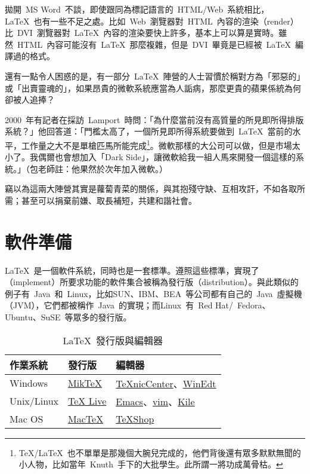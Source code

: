 拋開~MS Word~不談，即使跟同為標記語言的~HTML/Web~系統相比，\LaTeX~也有一些不足之處。比如~Web~瀏覽器對~HTML~內容的渲染（render）比~DVI~瀏覽器對~\LaTeX~內容的渲染要快上許多，基本上可以算是實時。雖然~HTML~內容可能沒有~LaTeX~那麼複雜，但是~DVI~畢竟是已經被~\LaTeX~編譯過的格式。

還有一點令人困惑的是，有一部分~\LaTeX~陣營的人士習慣於稱對方為「邪惡的」或「出賣靈魂的」，如果昂貴的微軟系統應當為人詬病，那麼更貴的蘋果係統為何卻被人追捧？

2000~年有記者在採訪~Lamport~時問：「為什麼當前沒有高質量的所見即所得排版系統？」他回答道：「門檻太高了，一個所見即所得系統要做到~\LaTeX~當前的水平，工作量之大不是單槍匹馬所能完成\footnote{\TeX/\LaTeX~也不單單是那幾個大腕兒完成的，他們背後還有眾多默默無聞的小人物，比如當年~Knuth~手下的大批學生。此所謂一將功成萬骨枯。}。微軟那樣的大公司可以做，但是市場太小了。我偶爾也會想加入「Dark Side」，讓微軟給我一組人馬來開發一個這樣的系統。」（包老師註：他果然於次年加入微軟。）

竊以為這兩大陣營其實是蘿蔔青菜的關係，與其抱殘守缺、互相攻訐，不如各取所需；甚至可以捐棄前嫌、取長補短，共建和諧社會。

\section{軟件準備}
\label{sec:latexsoft}

\LaTeX~是一個軟件系統，同時也是一套標準。遵照這些標準，實現了（implement）所要求功能的軟件集合被稱為發行版（distribution）。與此類似的例子有~Java~和~Linux，比如SUN、IBM、BEA~等公司都有自己的~Java~虛擬機（JVM），它們都被稱作~Java~的實現；而Linux~有~Red Hat/~Fedora、Ubuntu、SuSE~等眾多的發行版。

\begin{table}[htbp]
\caption{\LaTeX~發行版與編輯器}
\label{tab:latexsoft}
\centering
\begin{tabular}{lll}
    \toprule
    作業系統 & 發行版 & 編輯器 \\
    \midrule
    Windows & \href{http://www.miktex.org/}{MikTeX} & \href{http://www.toolscenter.org/}{TeXnicCenter}、\href{http://www.winedt.com/}{WinEdt} \\
    Unix/Linux & \href{http://www.tug.org/texlive/}{TeX Live} & \href{http://www.gnu.org/software/emacs/emacs.html}{Emacs}、\href{http://vim.sourceforge.net/}{vim}、\href{http://kile.sourceforge.net/}{Kile} \\
    Mac OS & \href{http://www.tug.org/mactex/}{MacTeX} & \href{http://www.uoregon.edu/~koch/texshop/}{TeXShop} \\
    \bottomrule
\end{tabular}
\end{table}

